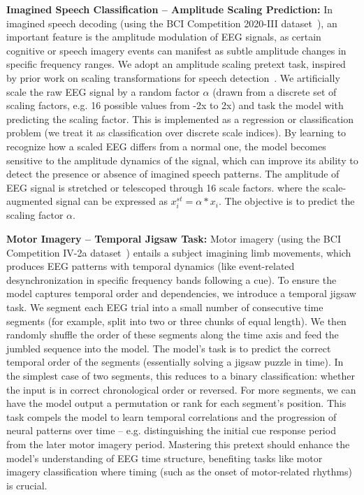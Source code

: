 \textbf{Imagined Speech Classification – Amplitude Scaling Prediction:} In imagined speech decoding (using the BCI Competition 2020-III dataset~\citep{jeong20222020}), an important feature is the amplitude modulation of EEG signals, as certain cognitive or speech imagery events can manifest as subtle amplitude changes in specific frequency ranges. We adopt an amplitude scaling pretext task, inspired by prior work on scaling transformations for speech detection~\cite{jayalath2024brain}. We artificially scale the raw EEG signal by a random factor $\alpha$ (drawn from a discrete set of scaling factors, e.g. 16 possible values from -2x to 2x) and task the model with predicting the scaling factor. This is implemented as a regression or classification problem (we treat it as classification over discrete scale indices). By learning to recognize how a scaled EEG differs from a normal one, the model becomes sensitive to the amplitude dynamics of the signal, which can improve its ability to detect the presence or absence of imagined speech patterns.  The amplitude of EEG signal is stretched or telescoped through 16 scale factors. where the scale-augmented signal can be expressed as $x_i^{st} = \alpha * x_i$. The objective is to predict the scaling factor $\alpha$.

\textbf{Motor Imagery – Temporal Jigsaw Task:} Motor imagery (using the BCI Competition IV-2a dataset~\citep{brunner2008bci}) entails a subject imagining limb movements, which produces EEG patterns with temporal dynamics (like event-related desynchronization in specific frequency bands following a cue). To ensure the model captures temporal order and dependencies, we introduce a temporal jigsaw task. We segment each EEG trial into a small number of consecutive time segments (for example, split into two or three chunks of equal length). We then randomly shuffle the order of these segments along the time axis and feed the jumbled sequence into the model. The model’s task is to predict the correct temporal order of the segments (essentially solving a jigsaw puzzle in time). In the simplest case of two segments, this reduces to a binary classification: whether the input is in correct chronological order or reversed. For more segments, we can have the model output a permutation or rank for each segment’s position. This task compels the model to learn temporal correlations and the progression of neural patterns over time – e.g. distinguishing the initial cue response period from the later motor imagery period. Mastering this pretext should enhance the model’s understanding of EEG time structure, benefiting tasks like motor imagery classification where timing (such as the onset of motor-related rhythms) is crucial.


